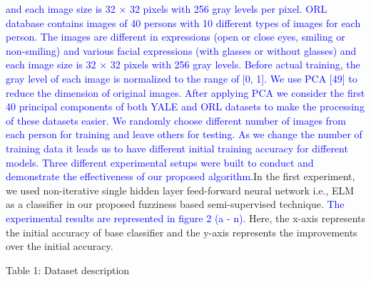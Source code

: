 \documentclass{article}
\begin{document}
		
		
		
		\newpage
		\textcolor{blue}{and each image size is 32 × 32 pixels with 256 gray levels per pixel. ORL database contains images of 40 persons with 10 different types of images for each person. The images are different in expressions (open or close eyes, smiling or non-smiling) and various facial expressions (with glasses or without glasses) and each image size is 32 × 32 pixels with 256 gray levels. Before actual training, the gray level of each image is normalized to the range of [0, 1]. We use PCA [49] to reduce the dimension of original images. After applying PCA we consider the first 40 principal components of both YALE and ORL datasets to make the processing of these datasets easier. We randomly choose different number of images from each person for training and leave others for testing. As we change the number of training data it leads us to have different initial training accuracy for different models. Three different experimental setups were built to conduct and demonstrate the effectiveness of our proposed algorithm.}In the first experiment, we used non-iterative single hidden layer feed-forward neural network i.e., ELM as a classifier in our proposed fuzziness based
		semi-supervised technique.\textcolor{blue}{ The experimental results are represented in figure 2 (a - n).} Here, the x-axis represents the initial accuracy of base classifier and the y-axis represents the improvements over the initial accuracy.\\
		\begin{center}
		\small Table 1: Dataset description
		\end{center}
		
\end{document}

